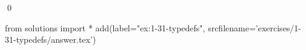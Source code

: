 
\begin{ex}
  \label{ex:1-31-typedefs}
  
  \qed
\end{ex}
\begin{python0}
from solutions import *
add(label="ex:1-31-typedefs",
    srcfilename='exercises/1-31-typedefs/answer.tex')
\end{python0}
